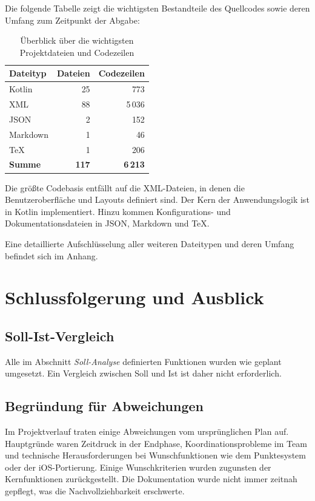 \documentclass[12pt,a4paper]{article}
\begin{document}
Die folgende Tabelle zeigt die wichtigsten Bestandteile des Quellcodes sowie deren Umfang zum Zeitpunkt der Abgabe:

\begin{table}[H]
\centering
\caption{Überblick über die wichtigsten Projektdateien und Codezeilen}
\begin{tabular}{lrr}
\toprule
\textbf{Dateityp} & \textbf{Dateien} & \textbf{Codezeilen} \\
\midrule
Kotlin    & 25  & 773 \\
XML       & 88  & 5\,036 \\
JSON      & 2   & 152 \\
Markdown  & 1   & 46 \\
TeX       & 1   & 206 \\
\midrule
\textbf{Summe}   & \textbf{117} & \textbf{6\,213} \\
\bottomrule
\end{tabular}
\end{table}

Die größte Codebasis entfällt auf die XML-Dateien, in denen die Benutzeroberfläche und Layouts definiert sind. Der Kern der Anwendungslogik ist in Kotlin implementiert. Hinzu kommen Konfigurations- und Dokumentationsdateien in JSON, Markdown und TeX.

Eine detaillierte Aufschlüsselung aller weiteren Dateitypen und deren Umfang befindet sich im Anhang.

\section{Schlussfolgerung und Ausblick}

\subsection{Soll-Ist-Vergleich}
Alle im Abschnitt \textit{Soll-Analyse} definierten Funktionen wurden wie geplant umgesetzt. Ein Vergleich zwischen Soll und Ist ist daher nicht erforderlich.

\subsection{Begründung für Abweichungen}
Im Projektverlauf traten einige Abweichungen vom ursprünglichen Plan auf. Hauptgründe waren Zeitdruck in der Endphase, Koordinationsprobleme im Team und technische Herausforderungen bei Wunschfunktionen wie dem Punktesystem oder der iOS-Portierung. Einige Wunschkriterien wurden zugunsten der Kernfunktionen zurückgestellt. Die Dokumentation wurde nicht immer zeitnah gepflegt, was die Nachvollziehbarkeit erschwerte.
\end{document}
